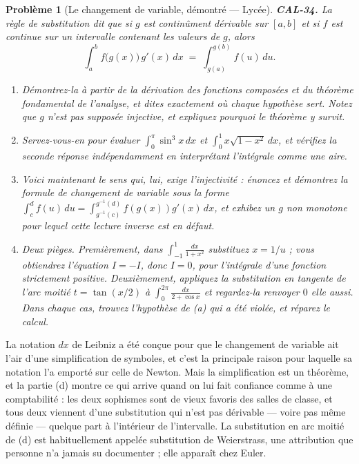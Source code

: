 \documentclass[11pt]{article}
\newtheorem{problem}{Problème}
\begin{document}
\bigskip

\begin{problem}[{Le changement de variable, démontré --- Lycée}]
\textbf{CAL-34.} La règle de substitution dit que si $ g $ est continûment dérivable sur
$ [a,b] $ et si $ f $ est continue sur un intervalle contenant les valeurs de $ g $, alors
\[ \int_a^b f\big(g(x)\big)\,g'(x)\,dx \;=\; \int_{g(a)}^{g(b)} f(u)\,du. \]
\begin{enumerate}
\item[(a)] Démontrez-la à partir de la dérivation des fonctions composées et du théorème fondamental de l'analyse, et dites exactement où
chaque hypothèse sert. Notez que $ g $ n'est \textit{pas} supposée injective, et expliquez
pourquoi le théorème y survit.
\item[(b)] Servez-vous-en pour évaluer $ \int_0^{\pi} \sin^3 x \,dx $ et $ \int_0^1 x\sqrt{1-x^2}\,dx $,
et vérifiez la seconde réponse indépendamment en interprétant l'intégrale comme une aire.
\item[(c)] Voici maintenant le sens qui, lui, exige l'injectivité : énoncez et démontrez la formule de changement
de variable sous la forme $ \int_c^d f(u)\,du = \int_{g^{-1}(c)}^{g^{-1}(d)} f(g(x))g'(x)\,dx $,
et exhibez un $ g $ non monotone pour lequel cette lecture inverse est en défaut.
\item[(d)] Deux pièges. Premièrement, dans $ \int_{-1}^{1} \frac{dx}{1+x^2} $ substituez $ x = 1/u $ ; vous
obtiendrez l'équation $ I = -I $, donc $ I = 0 $, pour l'intégrale d'une fonction strictement
positive. Deuxièmement, appliquez la substitution en tangente de l'arc moitié $ t = \tan(x/2) $ à
$ \int_0^{2\pi} \frac{dx}{2+\cos x} $ et regardez-la renvoyer $ 0 $ elle aussi. Dans chaque cas, trouvez
l'hypothèse de (a) qui a été violée, et réparez le calcul.
\end{enumerate}

\end{problem}

\noindent La notation $ dx $ de Leibniz a été conçue pour que le changement de variable ait l'air
d'une simplification de symboles, et c'est la principale raison pour laquelle sa notation l'a emporté sur celle de Newton. Mais la
simplification est un théorème, et la partie (d) montre ce qui arrive quand on lui fait confiance comme à une comptabilité :
les deux sophismes sont de vieux favoris des salles de classe, et tous deux viennent d'une substitution qui n'est pas
dérivable --- voire pas même définie --- quelque part à l'intérieur de l'intervalle. La substitution en arc moitié
de (d) est habituellement appelée substitution de Weierstrass, une attribution que personne n'a
jamais su documenter ; elle apparaît chez Euler.
\end{document}
